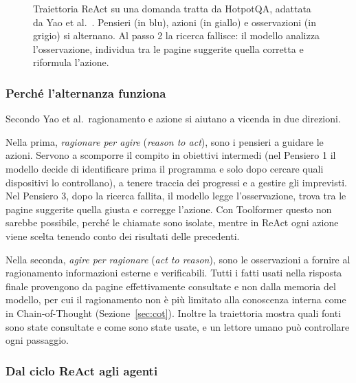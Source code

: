 \begin{figure}[htbp]
    \caption{Traiettoria ReAct su una domanda tratta da HotpotQA, adattata da Yao et al.\ \cite{yao2023react}. Pensieri (in blu), azioni (in giallo) e osservazioni (in grigio) si alternano. Al passo 2 la ricerca fallisce: il modello analizza l'osservazione, individua tra le pagine suggerite quella corretta e riformula l'azione.}
    \label{fig:react-esempio}
\end{figure}

\subsubsection{Perché l'alternanza funziona}

Secondo Yao et al.\ ragionamento e azione si aiutano a vicenda in due direzioni.

Nella prima, \emph{ragionare per agire} (\emph{reason to act}), sono i pensieri a guidare le azioni. Servono a scomporre il compito in obiettivi intermedi (nel Pensiero 1 il modello decide di identificare prima il programma e solo dopo cercare quali dispositivi lo controllano), a tenere traccia dei progressi e a gestire gli imprevisti. Nel Pensiero 3, dopo la ricerca fallita, il modello legge l'osservazione, trova tra le pagine suggerite quella giusta e corregge l'azione. Con Toolformer questo non sarebbe possibile, perché le chiamate sono isolate, mentre in ReAct ogni azione viene scelta tenendo conto dei risultati delle precedenti.

Nella seconda, \emph{agire per ragionare} (\emph{act to reason}), sono le osservazioni a fornire al ragionamento informazioni esterne e verificabili. Tutti i fatti usati nella risposta finale provengono da pagine effettivamente consultate e non dalla memoria del modello, per cui il ragionamento non è più limitato alla conoscenza interna come in Chain-of-Thought (Sezione~\ref{sec:cot}). Inoltre la traiettoria mostra quali fonti sono state consultate e come sono state usate, e un lettore umano può controllare ogni passaggio.

\subsubsection{Dal ciclo ReAct agli agenti}

